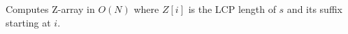 
Computes Z-array in $O(N)$ where $Z[i]$ is the LCP length of $s$ and its suffix starting at $i$.


